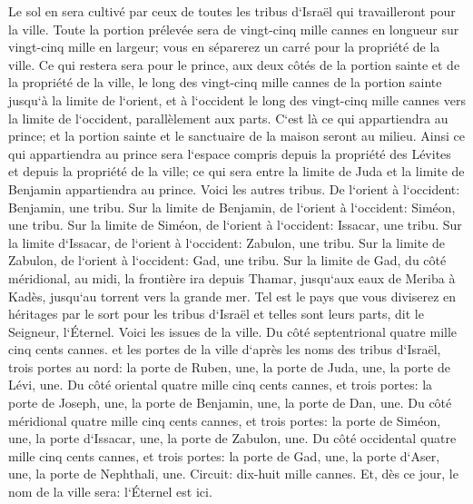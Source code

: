 \verse Le sol en sera cultivé par ceux de toutes les tribus d`Israël qui travailleront pour la ville. 
\verse Toute la portion prélevée sera de vingt-cinq mille cannes en longueur sur vingt-cinq mille en largeur; vous en séparerez un carré pour la propriété de la ville. 
\verse Ce qui restera sera pour le prince, aux deux côtés de la portion sainte et de la propriété de la ville, le long des vingt-cinq mille cannes de la portion sainte jusqu`à la limite de l`orient, et à l`occident le long des vingt-cinq mille cannes vers la limite de l`occident, parallèlement aux parts. C`est là ce qui appartiendra au prince; et la portion sainte et le sanctuaire de la maison seront au milieu. 
\verse Ainsi ce qui appartiendra au prince sera l`espace compris depuis la propriété des Lévites et depuis la propriété de la ville; ce qui sera entre la limite de Juda et la limite de Benjamin appartiendra au prince. 
\verse Voici les autres tribus. De l`orient à l`occident: Benjamin, une tribu. 
\verse Sur la limite de Benjamin, de l`orient à l`occident: Siméon, une tribu. 
\verse Sur la limite de Siméon, de l`orient à l`occident: Issacar, une tribu. 
\verse Sur la limite d`Issacar, de l`orient à l`occident: Zabulon, une tribu. 
\verse Sur la limite de Zabulon, de l`orient à l`occident: Gad, une tribu. 
\verse Sur la limite de Gad, du côté méridional, au midi, la frontière ira depuis Thamar, jusqu`aux eaux de Meriba à Kadès, jusqu`au torrent vers la grande mer. 
\verse Tel est le pays que vous diviserez en héritages par le sort pour les tribus d`Israël et telles sont leurs parts, dit le Seigneur, l`Éternel. 
\verse Voici les issues de la ville. Du côté septentrional quatre mille cinq cents cannes. 
\verse et les portes de la ville d`après les noms des tribus d`Israël, trois portes au nord: la porte de Ruben, une, la porte de Juda, une, la porte de Lévi, une. 
\verse Du côté oriental quatre mille cinq cents cannes, et trois portes: la porte de Joseph, une, la porte de Benjamin, une, la porte de Dan, une. 
\verse Du côté méridional quatre mille cinq cents cannes, et trois portes: la porte de Siméon, une, la porte d`Issacar, une, la porte de Zabulon, une. 
\verse Du côté occidental quatre mille cinq cents cannes, et trois portes: la porte de Gad, une, la porte d`Aser, une, la porte de Nephthali, une. 
\verse Circuit: dix-huit mille cannes. Et, dès ce jour, le nom de la ville sera: l`Éternel est ici. 
